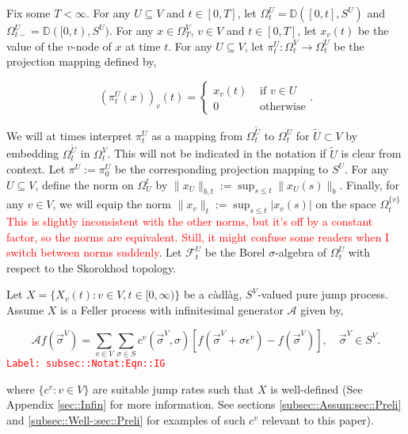 \documentclass[12pt]{article}
\newcommand{\mb}{\mathbb}
\newcommand{\mc}{\mathcal}
\newcommand{\ra}{\rightarrow}
\newcommand{\te}{\text}
\newcommand{\ep}{\epsilon}
\newcommand{\tr}{\textcolor{red}}
\newcommand{\labe}[1]{\tr{\texttt{Label: #1}}}
\newcommand{\ind}{\hspace{24pt}}
\newcommand{\defeq}{:=}								%
\newcommand{\cad}{\mb{D}}							%
\renewcommand{\v}{v}							%
\renewcommand{\U}{U}							%
\renewcommand{\S}{S}							%
\newcommand{\s}{\sigma}							%
\newcommand{\sv}{\vec{\s}}						%
\renewcommand{\b}{b}							%
\newcommand{\ev}{\ep}							%
\newcommand{\T}{T}								%
\newcommand{\x}{x}								%
\renewcommand{\t}{t}							%
\newcommand{\sset}{\Omega}						%
\newcommand{\proj}{\pi}							%
\renewcommand{\tt}{s}							%
\newcommand{\F}{\mc{F}}							%
\newcommand{\X}{X}								%
\newcommand{\IG}{\mc{A}}						%
\newcommand{\IGr}{c}							%
\newcommand{\vind}[1]{^{#1}}					%
\newcommand{\carp}[1]{^{#1}}					%
\newcommand{\vsi}[1]{^{#1}}						%
\newcommand{\cind}[1]{_{#1}}					%
\newcommand{\tp}[1]{(#1)}						%
\newcommand{\ts}[1]{_{#1}}						%
\newcommand{\alt}[1]{\widetilde{#1}}			%
\begin{document}
\ind Fix some \(\T < \infty\). For any \(\U\subseteq V\) and \(\t\in [0,\T]\), let \(\sset\vsi{\U}\ts{\t} = \cad([0,\t],\S\carp{\U})\) and \(\sset\vsi{\U}\ts{\t-} = \cad([0,\t),\S\carp{\U})\). For any \(\x \in \sset\vsi{V}\ts{\T}\), \(\v\in V\) and  \(\t \in [0,\T]\), let \(\x\cind{\v}\tp{\t}\) be the value of the \(\v\)-node of \(\x\) at time \(\t\). For any \(U\subseteq V\), let \(\proj\vsi{\U}\ts{\t}: \sset\vsi{V}\ts{\t} \ra \sset\vsi{\U}\ts{\t}\) be the projection mapping defined by,

\[\left(\proj\vsi{\U}\ts{\t}(\x)\right)\cind{\v}\tp{\t} = \begin{cases}
\x\cind{\v}\tp{\t} &\te{ if } \v \in \U\\
0 &\te{ otherwise}
\end{cases}.\]

We will at times interpret \(\proj\vsi{\U}\ts{\t}\) as a mapping from \(\sset\vsi{\alt{\U}}\ts{\t}\) to \(\sset\vsi{\U}\ts{\t}\) for \(\alt{\U}\subset V\) by embedding \(\sset\vsi{\alt{U}}\ts{\t}\) in \(\sset\vsi{V}\ts{\t}\). This will not be indicated in the notation if \(\alt{\U}\) is clear from context. Let \(\proj\vsi{\U} \defeq \proj\vsi{\U}\ts{0}\) be the corresponding projection mapping to \(\S\carp{\U}\). For any \(\U\subseteq V\), define the norm on \(\sset\vsi{\t}\ts{\U}\) by \(\|\x\cind{\U}\|_{\b,\t} \defeq \sup_{\tt \leq \t} \|\x\cind{\U}\tp{\tt}\|_{\b}\). Finally, for any \(\v\in V\), we will equip the norm \(\|\x\cind{\v}\|_\t \defeq \sup_{\tt\leq \t} |x\cind{\v}\tp{\tt}|\) on the space \(\sset\vsi{\{\v\}}\ts{\t}\) \tr{This is slightly inconsistent with the other norms, but it's off by a constant factor, so the norms are equivalent. Still, it might confuse some readers when I switch between norms suddenly}. Let \(\F\vsi{\U}\ts{\t}\) be the Borel \(\sigma\)-algebra of \(\sset\vsi{\U}\ts{\t}\) with respect to the Skorokhod topology. 

\ind Let \(\X = \{\X\cind{\v}\tp{\t}:\v\in V,\t\in [0,\infty)\}\) be a c\`adl\`ag, \(\S\carp{V}\)-valued pure jump process. Assume \(\X\) is a Feller process with infinitesimal generator \(\IG\) given by,

\begin{equation}
\IG f(\sv\vsi{V}) = \sum_{\v \in V}\sum_{\s \in \S} \IGr\vind{\v}(\sv\vsi{V},\s)[f(\sv\vsi{V} + \s \ev\vind{\v}) - f(\sv\vsi{V})], \quad \sv\vsi{V} \in \S\carp{V}.
\label{subsec::Notat:Eqn::IG}
\end{equation}
\labe{subsec::Notat:Eqn::IG}

where \(\{\IGr\vind{\v}:\v\in V\}\) are suitable jump rates such that \(\X\) is well-defined (See Appendix \ref{sec::Infin} for more information. See sections \ref{subsec::Assum:sec::Preli} and \ref{subsec::Well-:sec::Preli} for examples of such \(\IGr\vind{\v}\) relevant to this paper). 
\end{document}
